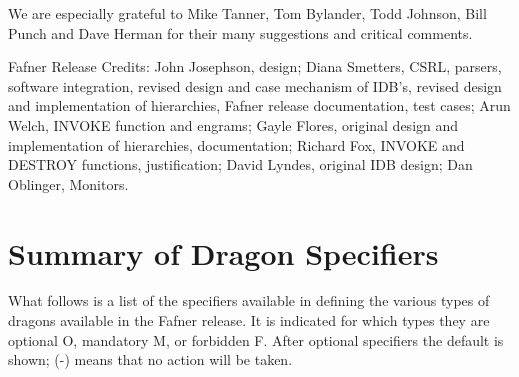 We are especially grateful to Mike Tanner, Tom Bylander, Todd Johnson,
Bill Punch and Dave Herman for their many suggestions and critical
comments.

Fafner Release Credits: John Josephson, design; Diana Smetters, CSRL,
parsers, software integration, revised design and case mechanism of
IDB's, revised design and implementation of hierarchies, Fafner
release documentation, test cases; Arun Welch, INVOKE function and
engrams; Gayle Flores, original design and implementation of
hierarchies, documentation; Richard Fox, INVOKE and DESTROY functions,
justification; David Lyndes, original IDB design; Dan Oblinger, Monitors.



\chapter{Summary of Dragon Specifiers}


What follows is a list of the specifiers available in defining the
various types of dragons available in the Fafner release.  It is
indicated for which types they are optional O, mandatory M, or
forbidden F.  After optional specifiers the default is shown; (-)
means that no action will be taken.

